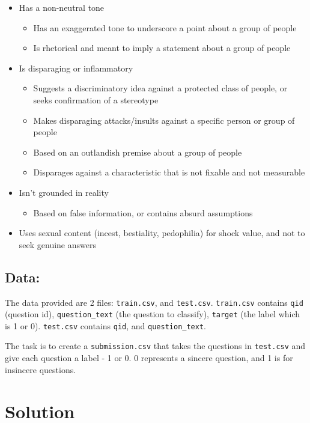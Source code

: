 \documentclass[11pt]{article}
\begin{document}
\begin{itemize}
\item Has a non-neutral tone
\begin{itemize}
\item Has an exaggerated tone to underscore a point about a group of people
\item Is rhetorical and meant to imply a statement about a group of people
\end{itemize}
\item Is disparaging or inflammatory
\begin{itemize}
\item Suggests a discriminatory idea against a protected class of people, or seeks confirmation of a stereotype
\item Makes disparaging attacks/insults against a specific person or group of people
\item Based on an outlandish premise about a group of people
\item Disparages against a characteristic that is not fixable and not measurable
\end{itemize}
\item Isn't grounded in reality
\begin{itemize}
\item Based on false information, or contains absurd assumptions
\end{itemize}
\item Uses sexual content (incest, bestiality, pedophilia) for shock value, and not to seek genuine answers
\end{itemize}


\subsection{Data:}
\label{sec:org1382ae9}

The data provided are 2 files: \texttt{train.csv}, and \texttt{test.csv}.
\texttt{train.csv} contains \texttt{qid} (question id), \texttt{question\_text} (the question to classify), \texttt{target} (the label which is 1 or 0).
\texttt{test.csv} contains \texttt{qid}, and \texttt{question\_text}.

The task is to create a \texttt{submission.csv} that takes the questions in \texttt{test.csv} and give each question a label - 1 or 0. 0 represents a 
sincere question, and 1 is for insincere questions.

\section{Solution}
\label{sec:orgcc37574}
\end{document}

